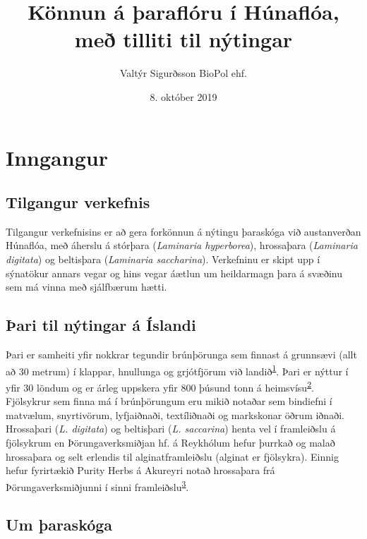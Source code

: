 \documentclass[icelandic,]{book}
\title{{Könnun á þaraflóru í Húnaflóa, með tilliti til nýtingar}}
\author{{Valtýr Sigurðsson}
BioPol ehf.}
\date{8. október 2019}
\begin{document}
\maketitle

{
\setcounter{tocdepth}{1}
\tableofcontents
}
\listoftables
\listoffigures
\hypertarget{inngangur}{%
\chapter{Inngangur}\label{inngangur}}

\hypertarget{tilgangur-verkefnis}{%
\section{Tilgangur verkefnis}\label{tilgangur-verkefnis}}

Tilgangur verkefnisins er að gera forkönnun á nýtingu þaraskóga við austanverðan Húnaflóa, með áherslu á stórþara (\emph{Laminaria hyperborea}), hrossaþara (\emph{Laminaria digitata}) og beltisþara (\emph{Laminaria saccharina}). Verkefninu er skipt upp í sýnatökur annars vegar og hins vegar áætlun um heildarmagn þara á svæðinu sem má vinna með sjálfbærum hætti.

\hypertarget{ari-til-nytingar-a-islandi}{%
\section{Þari til nýtingar á Íslandi}\label{ari-til-nytingar-a-islandi}}

Þari er samheiti yfir nokkrar tegundir brúnþörunga sem finnast á grunnsævi (allt að 30 metrum) í klappar, hnullunga og grjótfjörum við landið\textsuperscript{\protect\hyperlink{ref-karl1997}{1}}. Þari er nýttur í yfir 30 löndum og er árleg uppskera yfir 800 þúsund tonn á heimsvísu\textsuperscript{\protect\hyperlink{ref-Monagail2017}{2}}. Fjölsykrur sem finna má í brúnþörungum eru mikið notaðar sem bindiefni í matvælum, snyrtivörum, lyfjaiðnaði, textíliðnaði og markskonar öðrum iðnaði. Hrossaþari (\emph{L. digitata}) og beltisþari (\emph{L. saccarina}) henta vel í framleiðslu á fjölsykrum en Þörungaverksmiðjan hf. á Reykhólum hefur þurrkað og malað hrossaþara og selt erlendis til alginatframleiðslu (alginat er fjölsykra). Einnig hefur fyrirtækið Purity Herbs á Akureyri notað hrossaþara frá Þörungaverksmiðjunni í sinni framleiðslu\textsuperscript{\protect\hyperlink{ref-Jonsdottir2011}{3}}.

\hypertarget{um-araskoga}{%
\section{Um þaraskóga}\label{um-araskoga}}
\end{document}
